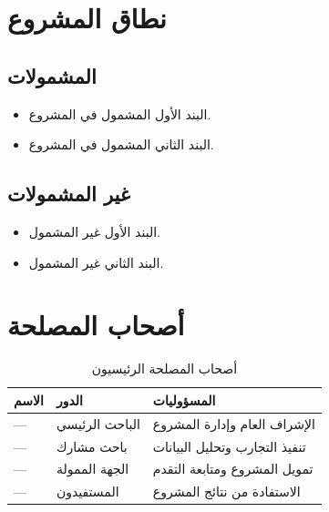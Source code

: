 \documentclass[11pt,a4paper]{article}
\begin{document}
\section{نطاق المشروع}
\label{sec:scope}

\subsection{المشمولات}
\begin{itemize}
    \item البند الأول المشمول في المشروع.
    \item البند الثاني المشمول في المشروع.
\end{itemize}

\subsection{غير المشمولات}
\begin{itemize}
    \item البند الأول غير المشمول.
    \item البند الثاني غير المشمول.
\end{itemize}

\section{أصحاب المصلحة}
\label{sec:stakeholders}

\begin{table}[H]
\centering
\caption{أصحاب المصلحة الرئيسيون}
\renewcommand{\arraystretch}{1.3}
\begin{tabularx}{\textwidth}{L{4cm} L{4cm} X}
\toprule
\textbf{الاسم} & \textbf{الدور} & \textbf{المسؤوليات} \\
\midrule
--- & الباحث الرئيسي & الإشراف العام وإدارة المشروع \\
--- & باحث مشارك & تنفيذ التجارب وتحليل البيانات \\
--- & الجهة الممولة & تمويل المشروع ومتابعة التقدم \\
--- & المستفيدون & الاستفادة من نتائج المشروع \\
\bottomrule
\end{tabularx}
\end{table}
\end{document}
